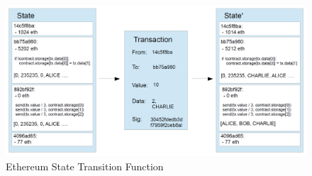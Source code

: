 \begin{figure}[h]
	\includegraphics[width=14cm]{ethereum_state_transition_function}	%
	\caption{Ethereum State Transition Function}
	\label{fig:ethereum_state_transition_function}
\end{figure}


 
\clearpage


